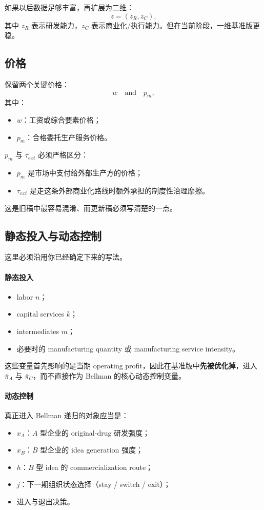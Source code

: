 \documentclass[12pt,fontset=none]{ctexart}
\begin{document}
如果以后数据足够丰富，再扩展为二维：
\[
 z=(z_R,z_C),
\]
其中 $z_R$ 表示研发能力，$z_C$ 表示商业化/执行能力。但在当前阶段，一维基准版更稳。

\subsection{价格}

保留两个关键价格：
\[
 w \quad \text{and} \quad p_m,
\]
其中：
\begin{itemize}
    \item $w$：工资或综合要素价格；
    \item $p_m$：合格委托生产服务价格。
\end{itemize}

$p_m$ 与 $\tau_{ext}$ 必须严格区分：
\begin{itemize}
    \item $p_m$ 是市场中支付给外部生产方的价格；
    \item $\tau_{ext}$ 是走这条外部商业化路线时额外承担的制度性治理摩擦。
\end{itemize}

这是旧稿中最容易混淆、而更新稿必须写清楚的一点。

\subsection{静态投入与动态控制}

这里必须沿用你已经确定下来的写法。

\paragraph{静态投入}
\begin{itemize}
    \item labor $n$；
    \item capital services $k$；
    \item intermediates $m$；
    \item 必要时的 manufacturing quantity 或 manufacturing service intensity。
\end{itemize}

这些变量首先影响的是当期 operating profit，因此在基准版中\textbf{先被优化掉}，进入 $\bar\pi_A$ 与 $\bar\pi_C$，而不直接作为 Bellman 的核心动态控制变量。

\paragraph{动态控制}
真正进入 Bellman 递归的对象应当是：
\begin{itemize}
    \item $x_A$：$A$ 型企业的 original-drug 研发强度；
    \item $x_B$：$B$ 型企业的 idea generation 强度；
    \item $h$：$B$ 型 idea 的 commercialization route；
    \item $j$：下一期组织状态选择（stay / switch / exit）；
    \item 进入与退出决策。
\end{itemize}
\end{document}
